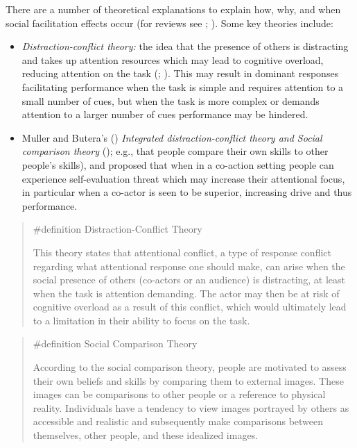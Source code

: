 \documentclass[
  letterpaper,
]{book}
\providecommand{\tightlist}{%
  \setlength{\itemsep}{0pt}\setlength{\parskip}{0pt}}\usepackage{longtable,booktabs,array}
\begin{document}
There are a number of theoretical explanations to explain how, why, and
when social facilitation effects occur (for reviews see
;
). Some key
theories include:

\begin{itemize}
\tightlist
\item
  \emph{Distraction-conflict theory:} the idea that the presence of
  others is distracting and takes up attention resources which may lead
  to cognitive overload, reducing attention on the task
  (;
  ). This may
  result in dominant responses facilitating performance when the task is
  simple and requires attention to a small number of cues, but when the
  task is more complex or demands attention to a larger number of cues
  performance may be hindered.
\item
  Muller and Butera's ()
  \emph{Integrated distraction-conflict theory and Social comparison
  theory} (); e.g., that
  people compare their own skills to other people's skills), and
  proposed that when in a co-action setting people can experience
  self-evaluation threat which may increase their attentional focus, in
  particular when a co-actor is seen to be superior, increasing drive
  and thus performance.
\end{itemize}

\begin{quote}
\label{def-distractionconflicttheory}{\#definition}
Distraction-Conflict Theory

This theory states that attentional conflict, a type of response
conflict regarding what attentional response one should make, can arise
when the social presence of others (co-actors or an audience) is
distracting, at least when the task is attention demanding. The actor
may then be at risk of cognitive overload as a result of this conflict,
which would ultimately lead to a limitation in their ability to focus on
the task.
\end{quote}

\begin{quote}
\label{def-socialcomparisontheory}{\#definition} Social
Comparison Theory

According to the social comparison theory, people are motivated to
assess their own beliefs and skills by comparing them to external
images. These images can be comparisons to other people or a reference
to physical reality. Individuals have a tendency to view images
portrayed by others as accessible and realistic and subsequently make
comparisons between themselves, other people, and these idealized
images.
\end{quote}
\end{document}
